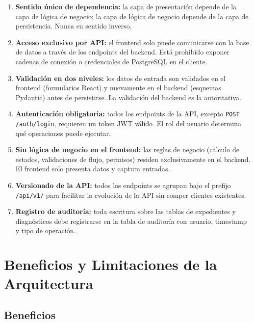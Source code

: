 \begin{enumerate}
	\item \textbf{Sentido único de dependencia:} la capa de presentación depende de la
	capa de lógica de negocio; la capa de lógica de negocio depende de la capa de
	persistencia. Nunca en sentido inverso.
	
	\item \textbf{Acceso exclusivo por API:} el frontend solo puede comunicarse con la
	base de datos a través de los endpoints del backend. Está prohibido exponer
	cadenas de conexión o credenciales de PostgreSQL en el cliente.
	
	\item \textbf{Validación en dos niveles:} los datos de entrada son validados en el
	frontend (formularios React) y nuevamente en el backend (esquemas Pydantic)
	antes de persistirse. La validación del backend es la autoritativa.
	
	\item \textbf{Autenticación obligatoria:} todos los endpoints de la API, excepto
	\texttt{POST /auth/login}, requieren un token JWT válido. El rol del usuario
	determina qué operaciones puede ejecutar.
	
	\item \textbf{Sin lógica de negocio en el frontend:} las reglas de negocio
	(cálculo de estados, validaciones de flujo, permisos) residen exclusivamente
	en el backend. El frontend solo presenta datos y captura entradas.
	
	\item \textbf{Versionado de la API:} todos los endpoints se agrupan bajo el prefijo
	\texttt{/api/v1/} para facilitar la evolución de la API sin romper clientes
	existentes.
	
	\item \textbf{Registro de auditoría:} toda escritura sobre las tablas de expedientes
	y diagnósticos debe registrarse en la tabla de auditoría con usuario, timestamp
	y tipo de operación.
\end{enumerate}

\section{Beneficios y Limitaciones de la Arquitectura}

\subsection{Beneficios}

